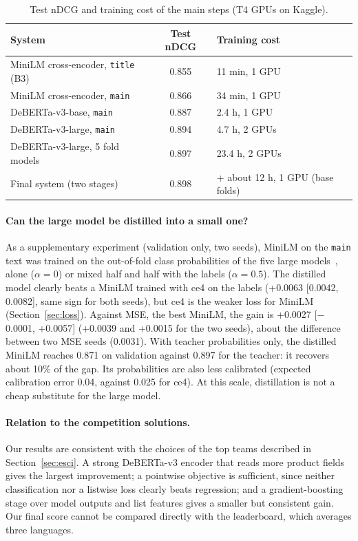 \documentclass[12pt,a4paper]{report}
\begin{document}
\begin{table}[H]
\centering
\caption{Test nDCG and training cost of the main steps (T4 GPUs on Kaggle).}
\label{tab:cost}
\small
\begin{tabular}{@{}lcl@{}}
\toprule
\textbf{System} & \textbf{Test nDCG} & \textbf{Training cost} \\
\midrule
MiniLM cross-encoder, \texttt{title} (B3) & 0.855 & 11 min, 1 GPU \\
MiniLM cross-encoder, \texttt{main} & 0.866 & 34 min, 1 GPU \\
DeBERTa-v3-base, \texttt{main} & 0.887 & 2.4 h, 1 GPU \\
DeBERTa-v3-large, \texttt{main} & 0.894 & 4.7 h, 2 GPUs \\
DeBERTa-v3-large, 5 fold models & 0.897 & 23.4 h, 2 GPUs \\
Final system (two stages) & 0.898 & + about 12 h, 1 GPU (base folds) \\
\bottomrule
\end{tabular}
\end{table}

\paragraph{Can the large model be distilled into a small one?} As a supplementary experiment (validation only, two seeds), MiniLM on the \texttt{main} text was trained on the out-of-fold class probabilities of the five large models~\cite{kd}, alone ($\alpha = 0$) or mixed half and half with the labels ($\alpha = 0.5$). The distilled model clearly beats a MiniLM trained with ce4 on the labels (+0.0063 [0.0042, 0.0082], same sign for both seeds), but ce4 is the weaker loss for MiniLM (Section~\ref{sec:loss}). Against MSE, the best MiniLM, the gain is +0.0027 [$-$0.0001, +0.0057] (+0.0039 and +0.0015 for the two seeds), about the difference between two MSE seeds (0.0031). With teacher probabilities only, the distilled MiniLM reaches 0.871 on validation against 0.897 for the teacher: it recovers about 10\% of the gap. Its probabilities are also less calibrated (expected calibration error 0.04, against 0.025 for ce4). At this scale, distillation is not a cheap substitute for the large model.

\paragraph{Relation to the competition solutions.} Our results are consistent with the choices of the top teams described in Section~\ref{sec:esci}. A strong DeBERTa-v3 encoder that reads more product fields gives the largest improvement; a pointwise objective is sufficient, since neither classification nor a listwise loss clearly beats regression; and a gradient-boosting stage over model outputs and list features gives a smaller but consistent gain. Our final score cannot be compared directly with the leaderboard, which averages three languages.
\end{document}
